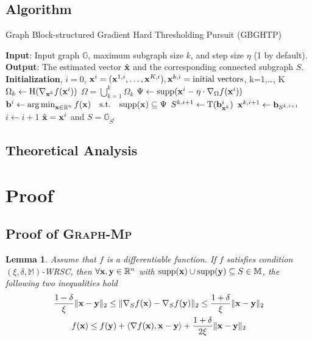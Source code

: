 \documentclass{article}
\let\oldReturn\Return
\renewcommand{\Return}{\State\oldReturn}
\DeclareMathOperator*{\argmin}{arg\,min}
\newtheorem{lemma}{Lemma}
\begin{document}
\subsection{Algorithm}

\begin{algorithm}
	\caption{Graph Block-structured Gradient Hard Thresholding Pursuit (GBGHTP)}\label{alg:gbghtp}
	\begin{algorithmic}[1]
		\State \textbf{Input}: Input graph $\mathbb{G}$, maximum subgraph size $k$, and step size $\eta$ (1 by default).
		\State \textbf{Output}: The estimated vector $\hat{{\bf x}}$ and the corresponding connected subgraph $S$.
		\State \textbf{Initialization}, $ i=0 $, ${\bf x}^i=({\bf x}^{1,i},\dots,{\bf x}^{K,i}), {\bf x}^{k,i}=\text{initial vectors}$, k=1,\dots, K
		\Repeat
		\State $\Omega_k\gets\mathrm{H}(\nabla _{{\bf x}^k}f({\bf x}^i))$
		\EndFor
		\State $\Omega=\bigcup_{k=1}^k \Omega_k$
		\State $\Psi\gets\mathrm{supp}({\bf x}^i-\eta\cdot\nabla_{\Omega} f({\bf x}^i))$
		\State ${\bf b}^i\gets\argmin_{{\bf x}\in\mathbb{R}^n}f({\bf x})\quad\mathrm{s.t.}\quad \mathrm{supp}({\bf x})\subseteq\Psi$\label{alg:gbghtp:argmin}
		\State $S^{k,i+1}\gets\mathrm{T}({\bf b}_{{\bf x}^k}^i)$
		\State ${\bf x}^{k,i+1}\gets{\bf b}_{S^{k,i+1}}$
		\EndFor
		\State $i\gets i+1$
		\Return $\hat{{\bf x}}={\bf x}^i$ and $S=\mathbb{G}_{S^i}$
	\end{algorithmic}
\end{algorithm}

\subsection{Theoretical Analysis}

\clearpage
\appendix

\section{Proof}

\subsection{Proof of \textsc{Graph}-\textsc{Mp}}

\begin{lemma}\label{lem:wrsc}
Assume that $f$ is a differentiable function. If $f$ satisfies condition $(\xi,\delta,\mathbb{M})$-WRSC, then $\forall {\bf x}, {\bf y}\in\mathbb{R}^n$ with $\mathrm{supp}({\bf x})\cup\mathrm{supp}({\bf y})\subseteq S\in\mathbb{M}$, the following two inequalities hold \cite{yuan2014gradient}
\begin{gather*}
\frac{1-\delta}{\xi}\|{\bf x}-{\bf y}\|_2\leq\|\nabla_S f({\bf x})-\nabla_S f({\bf y})\|_2\leq \frac{1+\delta}{\xi}\|{\bf x}-{\bf y}\|_2\\
f({\bf x})\leq f({\bf y})+\langle\nabla f({\bf x}),{\bf x}-{\bf y} \rangle+\frac{1+\delta}{2\xi}\|{\bf x}-{\bf y}\|_2
\end{gather*}
\end{lemma}
\end{document}
